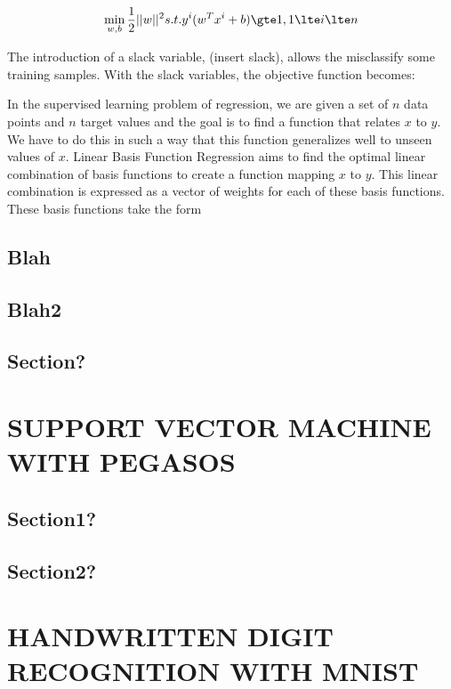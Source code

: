 \documentclass[a4paper,twoside]{article}
\begin{document}
\begin{equation}
\min_{w,b} \frac{1}{2} ||w||^2 s.t. y^i(w^T x^i + b) \gte 1, 1 \lte i \lte n
\end{equation}

 The introduction of a slack variable, (insert slack), allows the misclassify some training samples. With the slack variables, the objective function becomes:

In the supervised learning problem of regression, we are given a set of $n$ data points and $n$ target values and the goal is to find a function that relates $x$ to $y$. We have to do this in such a way that this function generalizes well to unseen values of $x$. Linear Basis Function Regression aims to find the optimal linear combination of basis functions to create a function mapping $x$ to $y$. This linear combination is expressed as a vector of weights for each of these basis functions. These basis functions take the form

\subsection{Blah}


\subsection{Blah2}


\subsection{Section?}




\section{\uppercase{Support Vector Machine with Pegasos}}

\subsection{Section1?}


\subsection{Section2?}



\section{\uppercase{Handwritten Digit Recognition with MNIST}}


\vfill
\end{document}
